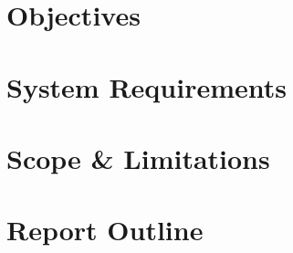 \documentclass[class=report,11pt,crop=false]{standalone}
\begin{document}
\section{Objectives}


\section{System Requirements}


\section{Scope \& Limitations}


\section{Report Outline}


\ifstandalone

\printnoidxglossary[type=\acronymtype,nonumberlist]
\fi
\end{document}

